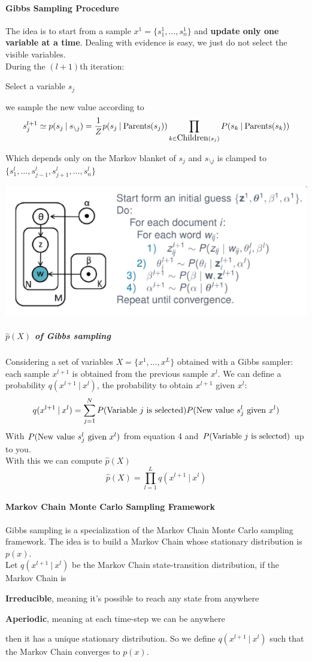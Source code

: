 \documentclass[10pt]{report}
\begin{document}
\paragraph{Gibbs Sampling Procedure}
The idea is to start from a sample $x^1=\{s_1^1,\ldots,s_n^1\}$ and \textbf{update only one variable at a time}. Dealing with evidence is easy, we just do not select the visible variables.\\
During the $(l+1)$th iteration:
\begin{list}{}{}
	\item Select a variable $s_j$
	\item we sample the new value according to $$s_j^{l+1}\simeq p(s_j\:|\:s_{\setminus j}) = \frac{1}{Z}p(s_j\:|\:\hbox{Parents}(s_j))\prod_{k\in\hbox{Children}(s_j)} P(s_k\:|\:\hbox{Parents}(s_k)) $$
\end{list}
Which depends only on the Markov blanket of $s_j$ and $s_{\setminus j}$ is clamped to$ \{s_1^l,\ldots,s_{j-1}^l,s_{j+1}^l,\ldots,s_n^l\}$
\begin{center}
	\includegraphics[scale=0.5]{45.png}
\end{center}
\subparagraph{$\hat{p}(X)$ of Gibbs sampling} Considering a set of variables $X=\{x^1,\ldots,x^L\}$ obtained with a Gibbs sampler: each sample $x^{l+1}$ is obtained from the previous sample $x^l$. We can define a probability $q(x^{l+1}\:|\:x^l)$, the probability to obtain $x^{l+1}$ given $x^l$:
$$q(x^{l+1}\:|\:x^l) = \sum_{j=1}^NP(\hbox{Variable }j\hbox{ is selected})P(\hbox{New value }s_j^l\hbox{ given }x^l)$$
With $P(\hbox{New value }s_j^l\hbox{ given }x^l)$ from equation 4 and $P(\hbox{Variable }j\hbox{ is selected})$ up to you.\\
With this we can compute $\hat{p}(X)$ $$\hat{p}(X)=\prod_{l=1}^L q(x^{l+1}\:|\:x^l)$$
\paragraph{Markov Chain Monte Carlo Sampling Framework} Gibbs sampling is a specialization of the Markov Chain Monte Carlo sampling framework. The idea is to build a Markov Chain whose stationary distribution is $p(x)$.\\
Let $q(x^{l+1}\:|\:x^l)$ be the Markov Chain state-transition distribution, if the Markov Chain is\begin{list}{}{}
	\item \textbf{Irreducible}, meaning it's possible to reach any state from anywhere
	\item \textbf{Aperiodic}, meaning at each time-step we can be anywhere
\end{list}
then it has a unique stationary distribution. So we define $q(x^{l+1}\:|\:x^l)$ such that the Markov Chain converges to $p(x)$.
\end{document}
